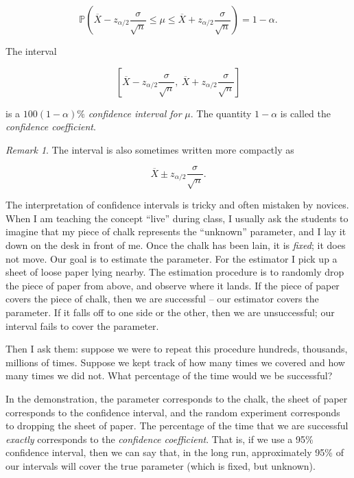 \documentclass[]{book}
\numberwithin{equation}{chapter}
\numberwithin{figure}{chapter}
\theoremstyle{plain}
\theoremstyle{definition}
\theoremstyle{remark}
\theoremstyle{definition}
\theoremstyle{definition}
\theoremstyle{remark}
\newtheorem*{remark}{Remark}
\let\BeginKnitrBlock\begin \let\EndKnitrBlock\end
\begin{document}
\begin{equation}
\mathbb{P}\left(\overline{X}-z_{\alpha/2}\frac{\sigma}{\sqrt{n}}\leq\mu\leq\overline{X}+z_{\alpha/2}\frac{\sigma}{\sqrt{n}}\right)=1-\alpha.
\end{equation}

\bigskip

\BeginKnitrBlock{definition}
\protect\hypertarget{def:unnamed-chunk-390}{}{\label{def:unnamed-chunk-390}}The
interval

\begin{equation}
\left[\overline{X}-z_{\alpha/2}\frac{\sigma}{\sqrt{n}},\ \overline{X}+z_{\alpha/2}\frac{\sigma}{\sqrt{n}}\right]
\end{equation}

is a \(100(1-\alpha)\%\) \emph{confidence interval for} \(\mu\). The
quantity \(1-\alpha\) is called the \emph{confidence coefficient}.
\EndKnitrBlock{definition}

\bigskip

\begin{remark}
The interval is also sometimes written more compactly as

\begin{equation}
\label{eq-z-interval}
\overline{X}\pm z_{\alpha/2}\frac{\sigma}{\sqrt{n}}.
\end{equation}
\end{remark}

The interpretation of confidence intervals is tricky and often mistaken
by novices. When I am teaching the concept ``live'' during class, I
usually ask the students to imagine that my piece of chalk represents
the ``unknown'' parameter, and I lay it down on the desk in front of me.
Once the chalk has been lain, it is \emph{fixed}; it does not move. Our
goal is to estimate the parameter. For the estimator I pick up a sheet
of loose paper lying nearby. The estimation procedure is to randomly
drop the piece of paper from above, and observe where it lands. If the
piece of paper covers the piece of chalk, then we are successful -- our
estimator covers the parameter. If it falls off to one side or the
other, then we are unsuccessful; our interval fails to cover the
parameter.

Then I ask them: suppose we were to repeat this procedure hundreds,
thousands, millions of times. Suppose we kept track of how many times we
covered and how many times we did not. What percentage of the time would
we be successful?

In the demonstration, the parameter corresponds to the chalk, the sheet
of paper corresponds to the confidence interval, and the random
experiment corresponds to dropping the sheet of paper. The percentage of
the time that we are successful \emph{exactly} corresponds to the
\emph{confidence coefficient}. That is, if we use a 95\% confidence
interval, then we can say that, in the long run, approximately 95\% of
our intervals will cover the true parameter (which is fixed, but
unknown).
\end{document}
